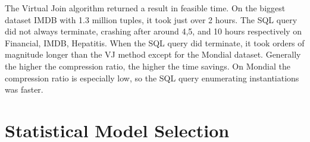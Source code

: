 \documentclass{vldb}
\newcommand{\ct}{\mathit{ct}}
\begin{document}
The Virtual Join algorithm returned a result in feasible time. On the biggest dataset IMDB with 1.3 million tuples, it took just over 2 hours. The SQL query did not always terminate, crashing after around 4,5, and 10 hours respectively on Financial, IMDB, Hepatitis. When the SQL query did terminate, it took orders of magnitude longer than the VJ method except for the Mondial dataset. Generally the higher the compression ratio, the higher the time savings. On Mondial the compression ratio is especially low, so the SQL query enumerating instantiations was faster. 

 
%
%
%



\section{Statistical Model Selection}
\end{document}
